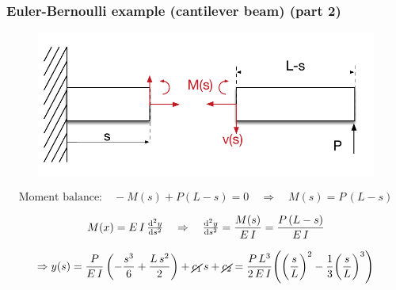 \begin{frame}
  \frametitle{Euler-Bernoulli example (cantilever beam) (part 2)}
  
  \begin{figure}
    \centering
    \includegraphics[width=14cm, keepaspectratio=true]{sections/traditional_beams/images/EulerCanitleverExample1part2}
  \end{figure} 
  
  \vspace{-1.4em}
  
  \begin{displaymath}
  \text{Moment balance:} \quad  -M(s) + P(L-s) = 0 \quad \Rightarrow \quad M(s) = P \, (L-s)
  \end{displaymath}
  
  \begin{displaymath}
    M(x) = E \, I \, \od[2]{y}{s} \quad \Rightarrow \quad \od[2]{y}{s} = \frac{M(s)}{E \, I}  = \frac{P \, (L-s)}{E \, I}
  \end{displaymath}
  
  \begin{displaymath}
    \Rightarrow y(s) = \frac{P}{E \, I} \, \biggl( - \frac{s^3}{6} + \frac{L \, s^2}{2} \biggr) + \cancel{c_1} \,s + \cancel{c_2} = \frac{P \, L^3}{2 \, E \, I} \Biggl( \biggl( \frac{s}{L} \biggr)^2 - \frac{1}{3} \biggl( \frac{s}{L} \biggr)^3 \Biggr)
  \end{displaymath}

\end{frame}

